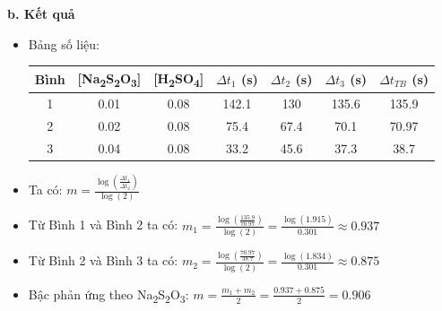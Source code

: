 \textbf{b. Kết quả}
\begin{itemize}
    \item Bảng số liệu:
    \begin{table}[H]
        \centering
        \begin{tabular}{|c|c|c|c|c|c|c|}
            \hline
            \textbf{Bình} & \textbf{[Na\textsubscript{2}S\textsubscript{2}O\textsubscript{3}]} & \textbf{[H\textsubscript{2}SO\textsubscript{4}]} & \textbf{$\Delta t_1$ (s)} & \textbf{$\Delta t_2$ (s)} & \textbf{$\Delta t_3$ (s)} & \textbf{$\Delta t_{TB}$ (s)} \\
            \hline
            1 & 0.01 & 0.08 & 142.1 & 130 & 135.6 & 135.9 \\
            \hline
            2 & 0.02 & 0.08 & 75.4 & 67.4 & 70.1 & 70.97 \\
            \hline
            3 & 0.04 & 0.08 & 33.2 & 45.6 & 37.3 & 38.7 \\
            \hline
        \end{tabular}
    \end{table}
    \item Ta có: $m = \frac{\log\left(\frac{\Delta t_1}{\Delta t_2}\right)}{\log(2)}$
    \item Từ Bình 1 và Bình 2 ta có: $m_1 = \frac{\log\left(\frac{135.9}{70.97}\right)}{\log(2)} = \frac{\log(1.915)}{0.301} \approx 0.937$
    \item Từ Bình 2 và Bình 3 ta có: $m_2 = \frac{\log\left(\frac{70.97}{38.7}\right)}{\log(2)} = \frac{\log(1.834)}{0.301} \approx 0.875$
    \item Bậc phản ứng theo Na\textsubscript{2}S\textsubscript{2}O\textsubscript{3}: $m = \frac{m_1 + m_2}{2} = \frac{0.937 + 0.875}{2} = 0.906$
\end{itemize}

